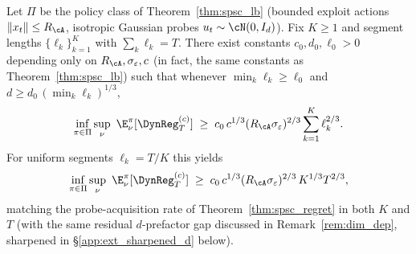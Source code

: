 \begin{theorem}
\label{thm:spsc_lb_piecewise}
Let $\Pi$ be the policy class of Theorem~\ref{thm:spsc_lb} (bounded
exploit actions $\|x_t\|\le R_\cA$, isotropic Gaussian probes
$u_t\sim\cN(0,I_d)$). Fix $K\ge 1$ and segment lengths
$\{\ell_k\}_{k=1}^K$ with $\sum_k\ell_k=T$. There exist constants
$c_0,d_0,\ell_0>0$ depending only on $R_\cA,\sigma_\varepsilon,c$
(in fact, the same constants as Theorem~\ref{thm:spsc_lb}) such that
whenever $\min_k\ell_k\ge\ell_0$ and $d\ge d_0\,(\min_k\ell_k)^{1/3}$,
\begin{equation}
\inf_{\pi\in\Pi}\sup_\nu\ \E^\pi_\nu[\DynReg_T^{(c)}]
\;\ge\; c_0\,c^{1/3}(R_\cA\sigma_\varepsilon)^{2/3}\sum_{k=1}^K\ell_k^{2/3}.
\label{eq:lb_piecewise}
\end{equation}
For uniform segments $\ell_k=T/K$ this yields
\begin{equation}
\inf_{\pi\in\Pi}\sup_\nu\ \E^\pi_\nu[\DynReg_T^{(c)}]
\;\ge\; c_0\,c^{1/3}(R_\cA\sigma_\varepsilon)^{2/3}\,K^{1/3}T^{2/3},
\label{eq:lb_piecewise_uniform}
\end{equation}
matching the probe-acquisition rate of Theorem~\ref{thm:spsc_regret}
in both $K$ and $T$ (with the same residual $d$-prefactor gap discussed
in Remark~\ref{rem:dim_dep}, sharpened in
\S\ref{app:ext_sharpened_d} below).
\end{theorem}

